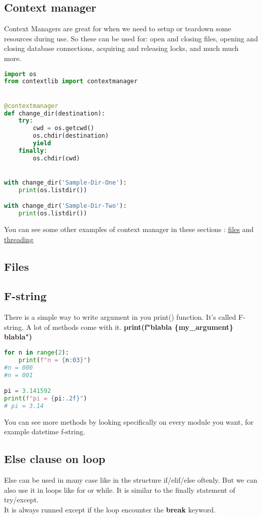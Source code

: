 \documentclass[a4paper, 12pt, titlepage]{scrartcl} %
\begin{document}
\subsection{Context manager}
\label{subsec:ContextManager}
Context Managers are great for when we need to setup or teardown some resources during use. So these can be used for: open and closing files, opening and closing database connections, acquiring and releasing locks, and much much more.

\begin{lstlisting}[language=Python]
import os
from contextlib import contextmanager


@contextmanager
def change_dir(destination):
    try:
        cwd = os.getcwd()
        os.chdir(destination)
        yield
    finally:
        os.chdir(cwd)


with change_dir('Sample-Dir-One'):
    print(os.listdir())

with change_dir('Sample-Dir-Two'):
    print(os.listdir())
\end{lstlisting} \vspace{5mm}

You can see some other examples of context manager in these sections : \hyperref[subsec:Files]{files} and \hyperref[subsec:Threading]{threading}

\subsection{Files}
\label{subsec:Files}

\subsection{F-string}
\label{subsec:F-string}
There is a simple way to write argument in you print() function. It's called F-string. A lot of methods come with it. \textbf{print(f"blabla \{my\_argument\} blabla")}
\begin{lstlisting}[language=Python]
for n in range(2):
	print(f"n = {n:03}")
#n = 000
#n = 001

pi = 3.141592
print(f"pi = {pi:.2f}") 
# pi = 3.14
\end{lstlisting} \vspace{5mm}

You can see more methods by looking specifically on every module you want, for example datetime f-string.

\subsection{Else clause on loop}
\label{subsec:Else}
Else can be used in many case like in the structure if/elif/else oftenly. But we can also use it in loops like for or while. It is similar to the finally statement of try/except. \\
It is always runned except if the loop encounter the \textbf{break} keyword.
\end{document}
